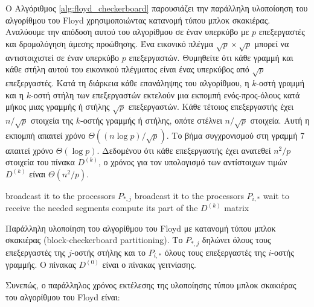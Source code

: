\documentclass[12pt,a4paper]{article} %
\begin{document}
{Ο Αλγόριθμος \ref{alg:floyd_checkerboard} παρουσιάζει την παράλληλη υλοποίοηση του αλγορίθμου του Floyd χρησιμοποιώντας κατανομή τύπου μπλοκ σκακιέρας. Αναλύουμε την απόδοση αυτού του αλγορίθμου σε έναν υπερκύβο με $p$ επεξεργαστές και δρομολόγηση άμεσης προώθησης. Ένα εικονικό πλέγμα $\sqrt{p} \times \sqrt{p}$ μπορεί να αντιστοιχιστεί σε έναν υπερκύβο $p$ επεξεργαστών. Θυμηθείτε ότι κάθε γραμμή και κάθε στήλη αυτού του εικονικού πλέγματος είναι ένας υπερκύβος από $\sqrt{p}$ επεξεργαστές. 
Κατά τη διάρκεια κάθε επανάληψης του αλγορίθμου, η $k$-οστή γραμμή και η $k$-οστή στήλη των επεξεργαστών εκτελούν μια εκπομπή ενός-προς-όλους κατά μήκος μιας γραμμής ή στήλης $\sqrt{p}$ επεξεργαστών. Κάθε τέτοιος επεξεργαστής έχει $n / \sqrt{p}$ στοιχεία της $k$-οστής γραμμής ή στήλης, οπότε στέλνει $n / \sqrt{p}$ στοιχεία. Αυτή η εκπομπή απαιτεί χρόνο $\Theta\!\left({(n \log p)}/{\sqrt{p}}\right)$. 
Το βήμα συγχρονισμού στη γραμμή 7 απαιτεί χρόνο $\Theta(\log p)$. Δεδομένου ότι κάθε επεξεργαστής έχει ανατεθεί $n^2 / p$ στοιχεία του πίνακα $D^{(k)}$, ο χρόνος για τον υπολογισμό των αντίστοιχων τιμών $D^{(k)}$ είναι $\Theta\!\left({n^2}/{p}\right)$. 

\begin{algorithm}[H]
\begin{algorithmic}[1]
            \State broadcast it to the processors $P_{*,j}$
        \EndFor
            \State broadcast it to the processors $P_{i,*}$
        \EndFor
            \State wait to receive the needed segments
        \EndFor
            \State compute its part of the $D^{(k)}$ matrix
        \EndFor
    \EndFor
\EndProcedure
\end{algorithmic}
\end{algorithm}

{\raggedright{} Παράλληλη υλοποίηση του αλγορίθμου του Floyd με κατανομή τύπου μπλοκ σκακιέρας (block-checkerboard partitioning). Το $P_{*,j}$ δηλώνει όλους τους επεξεργαστές της $j$-οστής στήλης και το $P_{i,*}$ όλους τους επεξεργαστές της $i$-οστής γραμμής. Ο πίνακας $D^{(0)}$ είναι ο πίνακας γειτνίασης.\label{alg:floyd_checkerboard}\par
\vspace{0.3cm}
Συνεπώς, ο παράλληλος χρόνος εκτέλεσης της υλοποίησης τύπου μπλοκ σκακιέρας του αλγορίθμου του Floyd είναι:

}}
\end{document}
